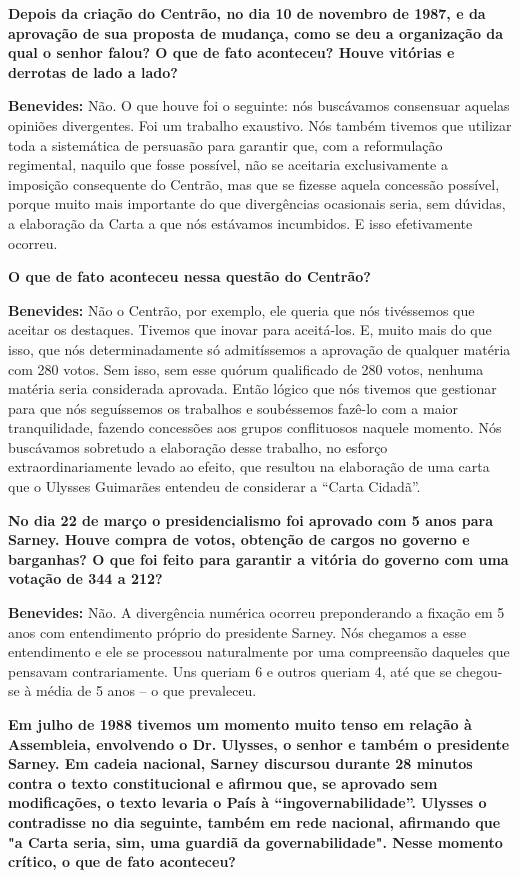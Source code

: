 \textbf{Depois da criação do Centrão, no dia 10 de novembro de 1987, e
da aprovação de sua proposta de mudança, como se deu a organização da
qual o senhor falou? O que de fato aconteceu? Houve vitórias e derrotas
de lado a lado?}

\textbf{Benevides:} Não. O que houve foi o seguinte: nós buscávamos
consensuar aquelas opiniões divergentes. Foi um trabalho exaustivo. Nós
também tivemos que utilizar toda a sistemática de persuasão para
garantir que, com a reformulação regimental, naquilo que fosse possível,
não se aceitaria exclusivamente a imposição consequente do Centrão, mas
que se fizesse aquela concessão possível, porque muito mais importante
do que divergências ocasionais seria, sem dúvidas, a elaboração da Carta
a que nós estávamos incumbidos. E isso efetivamente ocorreu.

\textbf{O que de fato aconteceu nessa questão do Centrão?}

\textbf{Benevides:} Não o Centrão, por exemplo, ele queria que nós
tivéssemos que aceitar os destaques. Tivemos que inovar para aceitá-los.
E, muito mais do que isso, que nós determinadamente só admitíssemos a
aprovação de qualquer matéria com 280 votos. Sem isso, sem esse quórum
qualificado de 280 votos, nenhuma matéria seria considerada aprovada.
Então lógico que nós tivemos que gestionar para que nós seguíssemos os
trabalhos e soubéssemos fazê-lo com a maior tranquilidade, fazendo
concessões aos grupos conflituosos naquele momento. Nós buscávamos
sobretudo a elaboração desse trabalho, no esforço extraordinariamente
levado ao efeito, que resultou na elaboração de uma carta que o Ulysses
Guimarães entendeu de considerar a ``Carta Cidadã''.

\textbf{No dia 22 de março o presidencialismo foi aprovado com 5 anos
para Sarney. Houve compra de votos, obtenção de cargos no governo e
barganhas? O que foi feito para garantir a vitória do governo com uma
votação de 344 a 212?}

\textbf{Benevides:} Não. A divergência numérica ocorreu preponderando a
fixação em 5 anos com entendimento próprio do presidente Sarney. Nós
chegamos a esse entendimento e ele se processou naturalmente por uma
compreensão daqueles que pensavam contrariamente. Uns queriam 6 e outros
queriam 4, até que se chegou-se à média de 5 anos -- o que prevaleceu.

\textbf{Em julho de 1988 tivemos um momento muito tenso em relação à
Assembleia, envolvendo o Dr. Ulysses, o senhor e também o presidente
Sarney. Em cadeia nacional, Sarney discursou durante 28 minutos contra o
texto constitucional e afirmou que, se aprovado sem modificações, o
texto levaria o País à ``ingovernabilidade''. Ulysses o contradisse no
dia seguinte, também em rede nacional, afirmando que "a Carta seria,
sim, uma guardiã da governabilidade". Nesse momento crítico, o que de
fato aconteceu?}

